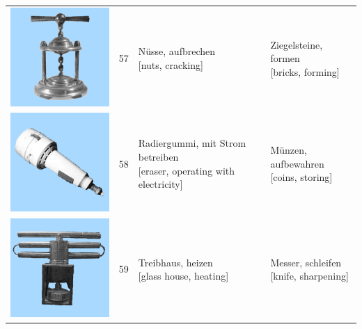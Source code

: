 \documentclass[
  english,
  doc,12pt,twoside,floatsintext]{apa7}
\begin{document}
\begin{center}
\begin{ThreePartTable}
{\begin{longtable}{llll}
\includegraphics[valign=c, scale=0.23]{../materials/unfamiliar/57.png} & 57 & \makecell[l]{Nüsse, aufbrechen\\{[nuts, cracking]}} & \makecell[l]{Ziegelsteine, formen\\{[bricks, forming]}}\\
\includegraphics[valign=c, scale=0.23]{../materials/unfamiliar/58.png} & 58 & \makecell[l]{Radiergummi, mit Strom betreiben\\{[eraser, operating with electricity]}} & \makecell[l]{Münzen, aufbewahren\\{[coins, storing]}}\\
\includegraphics[valign=c, scale=0.23]{../materials/unfamiliar/59.png} & 59 & \makecell[l]{Treibhaus, heizen\\{[glass house, heating]}} & \makecell[l]{Messer, schleifen\\{[knife, sharpening]}}\\

\end{longtable}}
\end{ThreePartTable}
\end{center}
\end{document}
